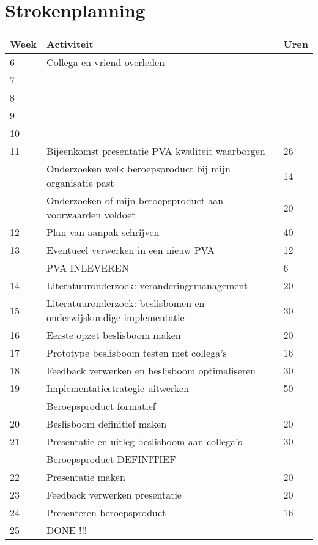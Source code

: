  \section{Strokenplanning}
 \begin{tabular}{|l|p{10cm}|l|}
    \hline
    Week & Activiteit & Uren \\
    \hline
    6  & Collega en vriend overleden & - \\
    7  &  &  \\
    8  &  &  \\
    9  &  &  \\
    10 &  &  \\
    11 & Bijeenkomst presentatie PVA kwaliteit waarborgen & 26 \\
       & Onderzoeken welk beroepsproduct bij mijn organisatie past & 14 \\
       & Onderzoeken of mijn beroepsproduct aan voorwaarden voldoet & 20 \\
    12 & Plan van aanpak schrijven & 40 \\
    13 & Eventueel verwerken in een nieuw PVA & 12 \\
       & PVA INLEVEREN & 6 \\
    14 & Literatuuronderzoek: veranderingsmanagement & 20 \\
    15 & Literatuuronderzoek: beslisbomen en onderwijskundige implementatie & 30 \\
    16 & Eerste opzet beslisboom maken & 20 \\
    17 & Prototype beslisboom testen met collega’s & 16 \\
    18 & Feedback verwerken en beslisboom optimaliseren & 30 \\
    19 & Implementatiestrategie uitwerken & 50 \\
       & Beroepsproduct formatief &   \\
    20 & Beslisboom definitief maken & 20 \\
    21 & Presentatie en uitleg beslisboom aan collega’s & 30 \\
       & Beroepsproduct DEFINITIEF & \\
    22 & Presentatie maken & 20 \\
    23 & Feedback verwerken presentatie & 20 \\
    24 & Presenteren beroepsproduct & 16 \\
    25 & DONE !!! & \\

    \hline
\end{tabular}
